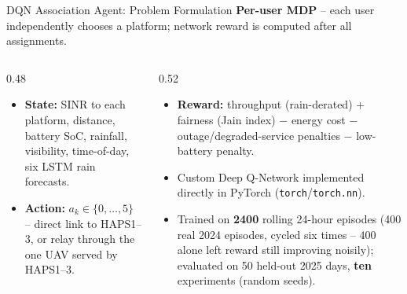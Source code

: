 \documentclass[aspectratio=169]{beamer}
\begin{document}
\begin{frame}{DQN Association Agent: Problem Formulation}
\footnotesize
\textbf{Per-user MDP} -- each user independently chooses a platform; network
reward is computed after all assignments.
\vspace{2mm}

\begin{columns}[T]
\begin{column}{0.48\textwidth}
\begin{itemize}\setlength{\itemsep}{3pt}
  \item \textbf{State:} SINR to each platform, distance, battery SoC,
        rainfall, visibility, time-of-day, six LSTM rain forecasts.
  \item \textbf{Action:} $a_k \in \{0,\dots,5\}$ -- direct link to
        HAPS1--3, or relay through the one UAV served by HAPS1--3.
\end{itemize}
\end{column}
\begin{column}{0.52\textwidth}
\begin{itemize}\setlength{\itemsep}{3pt}
  \item \textbf{Reward:} throughput (rain-derated) + fairness (Jain
        index) $-$ energy cost $-$ outage/degraded-service penalties
        $-$ low-battery penalty.
\end{itemize}
\vspace{2mm}
\begin{itemize}\setlength{\itemsep}{3pt}
  \item Custom Deep Q-Network implemented directly in PyTorch
        (\texttt{torch}/\texttt{torch.nn}).
  \item Trained on \textbf{2400} rolling 24-hour episodes (400 real
        2024 episodes, cycled six times -- 400 alone left reward still
        improving noisily); evaluated on 50 held-out 2025 days,
        \textbf{ten} experiments (random seeds).
\end{itemize}
\end{column}
\end{columns}
\end{frame}
\end{document}
